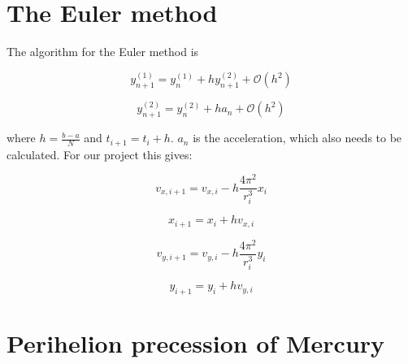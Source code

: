 \documentclass[11pt]{article}
\begin{document}
\section{The Euler method}

\begin{flushleft}
The algorithm for the Euler method is

\begin{equation}
y^{(1)}_{n+1} = y_n^{(1)} + hy_{n+1}^{(2)} + \mathcal{O}(h^2) 
\end{equation}

\begin{equation}
y^{(2)}_{n+1} = y^{(2)}_n +ha_n + \mathcal{O}(h^2)
\end{equation}


where $h = \frac{b-a}{N}$ and $t_{i+1} = t_i + h$. $a_n$ is the acceleration, which also needs to be calculated. For our project this gives: 

\begin{equation}
v_{x,i+1} = v_{x,i} - h \frac{4 \pi^2}{r_i^3} x_i
\end{equation}

\begin{equation}
x_{i+1} = x_i + hv_{x,i}
\end{equation}

\begin{equation}
v_{y,i+1} = v_{y,i} - h \frac{4 \pi^2}{r_i^3} y_i
\end{equation}

\begin{equation}
y_{i+1} = y_i + hv_{y,i}
\end{equation}
\end{flushleft}

\pagebreak

\section{Perihelion precession of Mercury}
\end{document}
